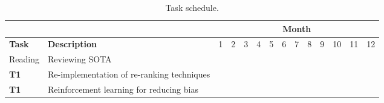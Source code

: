 

%
\begin{table}[t!]
	\centering
	\scriptsize	
	\caption{Task schedule.}
	\begin{tabular}{|p{0.80cm}|p{4.80cm}|p{0.40cm}|p{0.40cm}|p{0.40cm}|p{0.40cm}|p{0.40cm}|p{0.40cm}|p{0.40cm}|p{0.40cm}|p{0.40cm}|p{0.40cm}|p{0.40cm}|p{0.40cm}|}  \hline
		& & \multicolumn{12}{c|}{\textbf{Month}} \\ \hline
		\textbf{Task} & \textbf{Description} & 1 & 2 & 3 & 4 & 5 & 6  & 7 & 8 & 9 &  10 & 11 & 12 \\ \hline
		Reading & Reviewing SOTA & \cellcolor{lightgray} & \cellcolor{lightgray} &  &  &  &   &  &  &  &   & \cellcolor{lightgray} &  \\ \hline
		\textbf{T1} & Re-implementation of re-ranking techniques &  & \cellcolor{lightgray} & \cellcolor{lightgray} &   &   &   &  &  &  &   &  &  \\ \hline
		\textbf{T1} & Reinforcement learning for reducing bias &  &  & \cellcolor{lightgray} & \cellcolor{lightgray} &  \cellcolor{lightgray} &  \cellcolor{lightgray}  &  &  &  &   &  &  \\ \hline

\end{tabular}
\end{table}
